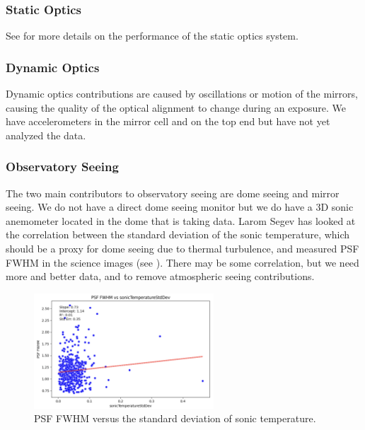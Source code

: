 \subsubsection{Static Optics}

See  for more details on the performance of the static optics system.

\subsubsection{Dynamic Optics}

Dynamic optics contributions are caused by oscillations or motion of the mirrors, causing the quality of the
optical alignment to change during an exposure. We have accelerometers in the mirror cell and on the top end
but have not yet analyzed the data.

\subsubsection{Observatory Seeing}

The two main contributors to observatory seeing are dome seeing and mirror seeing. We do not have a direct dome seeing monitor but we do have a 3D sonic anemometer located in the dome that is taking data. Larom Segev has looked at the correlation between the standard deviation of the sonic temperature, which should be a proxy for dome seeing due to thermal turbulence, and measured PSF FWHM in the science images (see ). There may be some correlation, but we need more and better data, and to remove atmospheric seeing contributions.

\begin{figure}
  \begin{center}
    \includegraphics[width=0.6\textwidth]{image_quality_figures/anemometer_PSF.png}
  \end{center}
  \caption{PSF FWHM versus the standard deviation of sonic temperature.}
  \label{fig:anemometer}
\end{figure}

